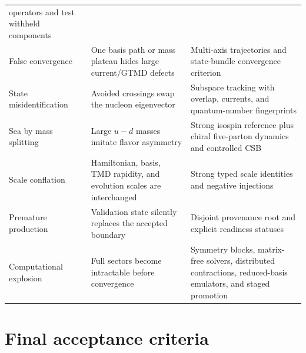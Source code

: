 \documentclass[11pt]{article}
\begin{document}
\begin{longtable}{L{0.23\textwidth}L{0.34\textwidth}L{0.35\textwidth}}
operators and test withheld components\\
False convergence & One basis path or mass plateau hides large current/GTMD
defects & Multi-axis trajectories and state-bundle convergence criterion\\
State misidentification & Avoided crossings swap the nucleon eigenvector &
Subspace tracking with overlap, currents, and quantum-number fingerprints\\
Sea by mass splitting & Large \(u-d\) masses imitate flavor asymmetry & Strong
isospin reference plus chiral five-parton dynamics and controlled CSB\\
Scale conflation & Hamiltonian, basis, TMD rapidity, and evolution scales are
interchanged & Strong typed scale identities and negative injections\\
Premature production & Validation state silently replaces the accepted boundary &
Disjoint provenance root and explicit readiness statuses\\
Computational explosion & Full sectors become intractable before convergence &
Symmetry blocks, matrix-free solvers, distributed contractions, reduced-basis
emulators, and staged promotion\\
\bottomrule
\end{longtable}

\section{Final acceptance criteria}
\label{sec:acceptance}
\end{document}
